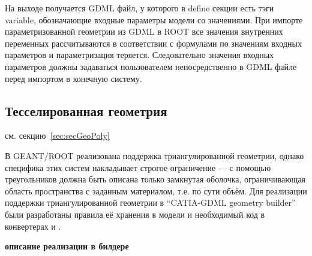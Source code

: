 На выходе получается GDML файл, у которого в define секции есть тэги variable, обозначающие входные параметры модели со значениями. При импорте параметризованной геометрии из GDML в ROOT все значения внутренних переменных рассчитываются в соответствии с формулами по значениям входных параметров и параметризация теряется. Следовательно значения входных параметров должны задаваться пользователем непосредственно в GDML файле перед импортом в конечную систему.

%                                               

\subsection{Тесселированная геометрия}\label{sec:Tesselated}

\todo см. секцию~\ref{sec:secGeoPoly}

В GEANT/ROOT реализована поддержка триангулированной геометрии, однако специфика этих систем накладывает строгое ограничение --- с помощью треугольников должна быть описана только замкнутая оболочка, ограничивающая область пространства с заданным материалом, т.е. по сути объём.
Для реализации поддержки триангулированной геометрии в ``CATIA-GDML geometry builder'' были разработаны правила её хранения в модели и необходимый код в конвертерах  и .

\todo \textbf{описание реализации в билдере}

%                                                                         

